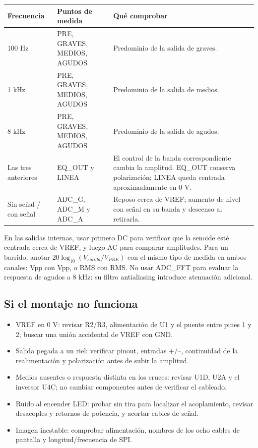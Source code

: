 \documentclass[10pt,a4paper]{article}
\begin{document}
\begin{tabularx}{\linewidth}{l l X}\toprule
Frecuencia & Puntos de medida & Qué comprobar\\\midrule
100 Hz & PRE, GRAVES, MEDIOS, AGUDOS & Predominio de la salida de graves.\\
1 kHz & PRE, GRAVES, MEDIOS, AGUDOS & Predominio de la salida de medios.\\
8 kHz & PRE, GRAVES, MEDIOS, AGUDOS & Predominio de la salida de agudos.\\
Las tres anteriores & EQ\_OUT y LINEA & El control de la banda correspondiente cambia la amplitud. EQ\_OUT conserva polarización; LINEA queda centrada aproximadamente en 0 V.\\
Sin señal / con señal & ADC\_G, ADC\_M y ADC\_A & Reposo cerca de VREF; aumento de nivel con señal en su banda y descenso al retirarla.\\\bottomrule
\end{tabularx}
En las salidas internas, usar primero DC para verificar que la senoide esté centrada cerca de VREF, y luego AC para comparar amplitudes. Para un barrido, anotar $20\log_{10}(V_{salida}/V_{PRE})$ con el mismo tipo de medida en ambos canales: Vpp con Vpp, o RMS con RMS. No usar ADC\_FFT para evaluar la respuesta de agudos a 8 kHz: su filtro antialiasing introduce atenuación adicional.

\subsection{Si el montaje no funciona}
\begin{itemize}
\item VREF en 0 V: revisar R2/R3, alimentación de U1 y el puente entre pines 1 y 2; buscar una unión accidental de VREF con GND.
\item Salida pegada a un riel: verificar pinout, entradas +/--, continuidad de la realimentación y polarización antes de subir la amplitud.
\item Medios ausentes o respuesta distinta en los cruces: revisar U1D, U2A y el inversor U4C; no cambiar componentes antes de verificar el cableado.
\item Ruido al encender LED: probar sin tira para localizar el acoplamiento, revisar desacoples y retornos de potencia, y acortar cables de señal.
\item Imagen inestable: comprobar alimentación, nombres de los ocho cables de pantalla y longitud/frecuencia de SPI.
\end{itemize}
\end{document}
